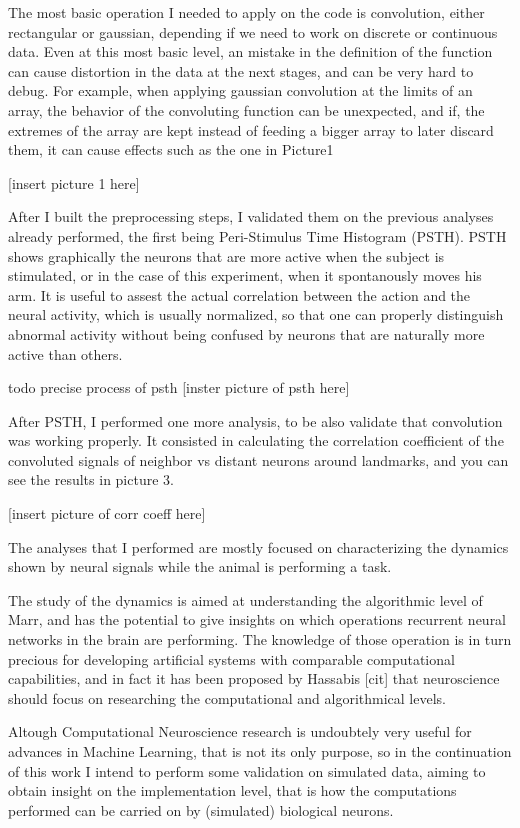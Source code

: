 The most basic operation I needed to apply on the code is convolution, either rectangular or gaussian, depending if we need to work on discrete or continuous data. Even at this most basic level, an mistake in the definition of the function can cause distortion in the data at the next stages, and can be very hard to debug. For example, when applying gaussian convolution at the limits of an array, the behavior of the convoluting function can be unexpected, and if, the extremes of the array are kept instead of feeding a bigger array to later discard them, it can cause effects such as the one in Picture1

[insert picture 1 here]

After I built the preprocessing steps, I validated them on the previous analyses already performed, the first being Peri-Stimulus Time Histogram (PSTH). PSTH shows graphically the neurons that are more active when the subject is stimulated, or in the case of this experiment, when it spontanously moves his arm. It is useful to assest the actual correlation between the action and the neural activity, which is usually normalized, so that one can properly distinguish abnormal activity without being confused by neurons that are naturally more active than others.

todo precise process of psth
[inster picture of psth here]

After PSTH, I performed one more analysis, to be also validate that convolution was working properly. It consisted in calculating the correlation coefficient of the convoluted signals of neighbor vs distant neurons around landmarks, and you can see the results in picture 3.

[insert picture of corr coeff here]

The analyses that I performed are mostly focused on characterizing the dynamics shown by neural signals while the animal is performing a task. 

The study of the dynamics is aimed at understanding the algorithmic level of Marr, and has the potential to give insights on which operations recurrent neural networks in the brain are performing. The knowledge of those operation is in turn precious for developing artificial systems with comparable computational capabilities, and in fact it has been proposed by Hassabis [cit] that neuroscience should focus on researching the computational and algorithmical levels. 

Altough Computational Neuroscience research is undoubtely very useful for advances in Machine Learning, that is not its only purpose, so in the continuation of this work I intend to perform some validation on simulated data, aiming to obtain insight on the implementation level, that is how the computations performed can be carried on by (simulated) biological neurons.

